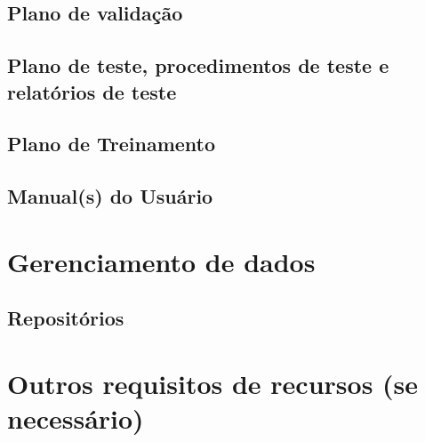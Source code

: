 \subsection{Plano de validação}

\subsection{Plano de teste, procedimentos de teste e relatórios de teste}

\subsection{Plano de Treinamento}

\subsection{Manual(s) do Usuário}

\section{Gerenciamento de dados}

\subsection{Repositórios}

\section{Outros requisitos de recursos (se necessário)}